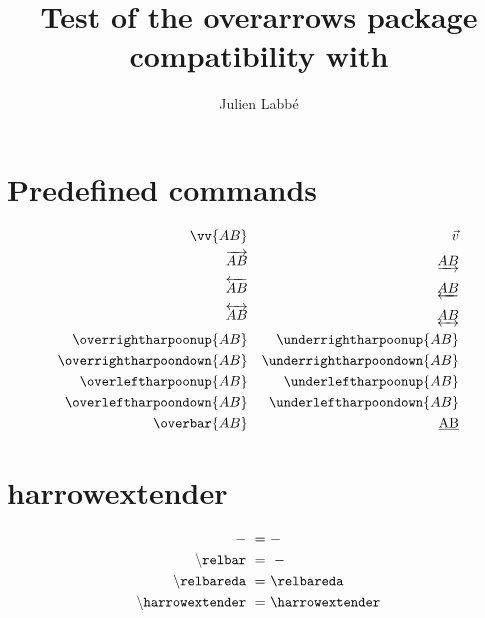 \documentclass{article}
\title{Test of the \textsf{overarrows} package\\compatibility with \pkg{unicode-math}}
\author{Julien Labb\'e}
\begin{document}
\maketitle

\section*{Predefined commands}

\begin{dispExample}
\begin{align*}
  \vv{AB}                   &  & \vec{v}                    \\
  \overrightarrow{AB}       &  & \underrightarrow{AB}       \\
  \overleftarrow{AB}        &  & \underleftarrow{AB}        \\
  \overleftrightarrow{AB}   &  & \underleftrightarrow{AB}   \\
  \overrightharpoonup{AB}   &  & \underrightharpoonup{AB}   \\
  \overrightharpoondown{AB} &  & \underrightharpoondown{AB} \\
  \overleftharpoonup{AB}    &  & \underleftharpoonup{AB}    \\
  \overleftharpoondown{AB}  &  & \underleftharpoondown{AB}  \\
  \overbar{AB}              &  & \underbar{AB}
\end{align*}
\end{dispExample}

\section*{harrowextender}

\begin{dispExample}
  \begin{align*}
    \mathtt{-} ~=~                         & - \\
    \mathtt{\backslash relbar} ~=~        & \relbar \\
    \mathtt{\backslash relbareda} ~=~      & \relbareda \\
    \mathtt{\backslash harrowextender} ~=~ & \harrowextender
  \end{align*}
\end{dispExample}

\begin{dispExample}
\TestOverArrow{\testharrowextender}
\end{dispExample}
\end{document}

